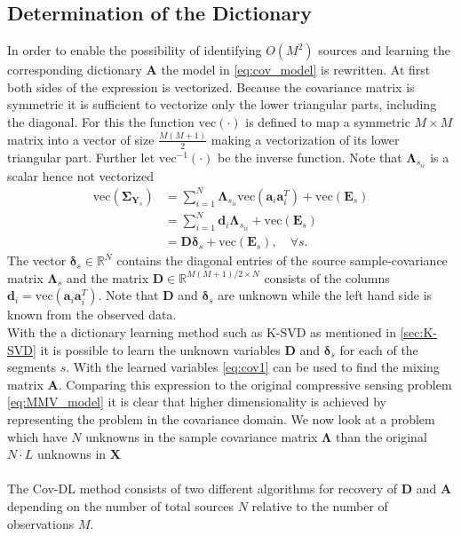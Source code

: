 \subsection{Determination of the Dictionary}
In order to enable the possibility of identifying $O(M^2)$ sources and learning the corresponding dictionary $\mathbf{A}$ the model in \eqref{eq:cov_model} is rewritten.  
At first both sides of the expression is vectorized. Because the covariance matrix is symmetric it is sufficient to vectorize only the lower triangular parts, including the diagonal. For this the function $\text{vec}(\cdot)$ is defined to map a symmetric $M \times M$ matrix into a vector of size $\frac{M(M+1)}{2}$ making a vectorization of its lower triangular part. Further let $\text{vec}^{-1}(\cdot)$ be the inverse function. Note that $\boldsymbol{\Lambda}_{s_{ii}}$ is a scalar hence not vectorized     
\begin{align}\label{eq:cov1}
\text{vec}(\boldsymbol{\Sigma}_{\mathbf{Y}_s}) &= \sum_{i=1}^N \boldsymbol{\Lambda}_{s_{ii}} \text{vec}(\mathbf{a}_i \mathbf{a}_i^T) + \text{vec}(\mathbf{E}_s) \nonumber \\
&= \sum_{i=1}^N \mathbf{d}_i \boldsymbol{\Lambda}_{s_{ii}} + \text{vec}(\mathbf{E}_s) \nonumber \\
&= \mathbf{D} \boldsymbol{\delta}_s + \text{vec}(\mathbf{E}_s), \quad \forall s.
\end{align}
The vector $\boldsymbol{\delta}_s \in \mathbb{R}^{N}$ contains the diagonal entries of the source sample-covariance matrix $\boldsymbol{\Lambda}_s$
and the matrix $\mathbf{D} \in \mathbb{R}^{M(M+1)/2 \times N}$ consists of the columns $\mathbf{d}_i = \text{vec}(\mathbf{a}_i \mathbf{a}_i^T)$. Note that $\mathbf{D}$ and $\boldsymbol{\delta}_s$ are unknown while the left hand side is known from the observed data.
\\
With the a dictionary learning method such as K-SVD as mentioned in \ref{sec:K-SVD} it is possible to learn the unknown variables $\mathbf{D}$ and $\boldsymbol{\delta}_s$ for each of the segments $s$. With the learned variables \eqref{eq:cov1} can be used to find the mixing matrix $\mathbf{A}$. Comparing this expression to the original compressive sensing problem \eqref{eq:MMV_model} it is clear that higher dimensionality is achieved by representing the problem in the covariance domain. We now look at a problem which have $N$ unknowns in the sample covariance matrix $\boldsymbol{\Lambda}$ than the original $N \cdot L$ unknowns in $\mathbf{X}$
\\ \\
The Cov-DL method consists of two different algorithms for  recovery of $\mathbf{D}$ and $\mathbf{A}$ depending on the number of total sources $N$ relative to the number of observations $M$. 

